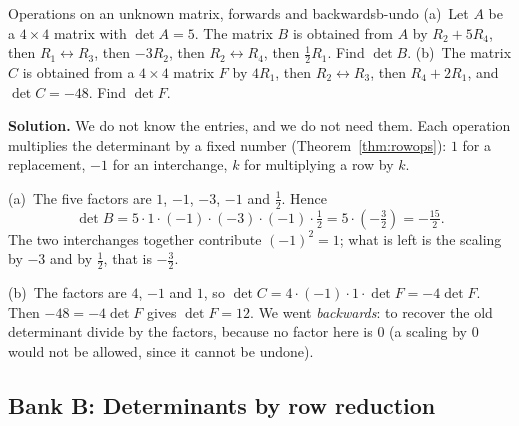 \documentclass[11pt]{article}
\begin{document}
\begin{exmp}{Operations on an unknown matrix, forwards and backwards}{b-undo}
(a)~Let $A$ be a $4\times4$ matrix with $\det A=5$. The matrix $B$ is obtained from $A$ by $R_2+5R_4$, then $R_1\leftrightarrow R_3$, then $-3R_2$, then $R_2\leftrightarrow R_4$, then $\tfrac12R_1$. Find $\det B$. (b)~The matrix $C$ is obtained from a $4\times4$ matrix $F$ by $4R_1$, then $R_2\leftrightarrow R_3$, then $R_4+2R_1$, and $\det C=-48$. Find $\det F$.

\textbf{Solution.} We do not know the entries, and we do not need them. Each operation multiplies the determinant by a fixed number (Theorem~\ref{thm:rowops}): $1$ for a replacement, $-1$ for an interchange, $k$ for multiplying a row by $k$.

(a)~The five factors are $1$, $-1$, $-3$, $-1$ and $\tfrac12$. Hence
\[
\det B=5\cdot1\cdot(-1)\cdot(-3)\cdot(-1)\cdot\tfrac12=5\cdot\left(-\tfrac32\right)=-\tfrac{15}2.
\]
The two interchanges together contribute $(-1)^2=1$; what is left is the scaling by $-3$ and by $\tfrac12$, that is $-\tfrac32$.

(b)~The factors are $4$, $-1$ and $1$, so $\det C=4\cdot(-1)\cdot1\cdot\det F=-4\det F$. Then $-48=-4\det F$ gives $\det F=12$. We went \emph{backwards}: to recover the old determinant divide by the factors, because no factor here is $0$ (a scaling by $0$ would not be allowed, since it cannot be undone).
\end{exmp}

\subsection*{Bank B: Determinants by row reduction}
\end{document}
